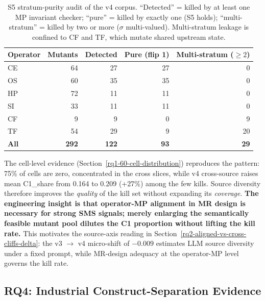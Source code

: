 \documentclass[manuscript,screen,review]{acmart}
\begin{document}
{%
\begin{longtable}[]{@{}lrrrr@{}}
\caption{S5 stratum-purity audit of the v4 corpus. ``Detected'' = killed
by at least one MP invariant checker; ``pure'' = killed by exactly one
(S5 holds); ``multi-stratum'' = killed by two or more ($\sigma$
multi-valued). Multi-stratum leakage is confined to CF and TF, which
mutate shared upstream state.}\label{tab:s5-purity}\\
\toprule\noalign{}
Operator & Mutants & Detected & Pure (flip 1) & Multi-stratum ($\ge 2$) \\
\midrule\noalign{}
\endfirsthead
\endhead
\bottomrule\noalign{}
\endlastfoot
CE & 64 & 27 & 27 & 0 \\
OS & 60 & 35 & 35 & 0 \\
HP & 72 & 11 & 11 & 0 \\
SI & 33 & 11 & 11 & 0 \\
CF & 9 & 9 & 0 & 9 \\
TF & 54 & 29 & 9 & 20 \\
\textbf{All} & \textbf{292} & \textbf{122} & \textbf{93} & \textbf{29} \\
\end{longtable}
}

The cell-level evidence (Section~\ref{rq1-60-cell-distribution}) reproduces the
pattern: 75\% of cells are zero, concentrated in the cross slices, while v4
cross-source raises mean C1\_share from 0.164 to 0.209 (+27\%) among the few
kills. Source diversity therefore improves the \emph{quality} of the kill set
without expanding its \emph{coverage}. \textbf{The engineering insight is that
operator-MP alignment in MR design is necessary for strong SMS signals; merely
enlarging the semantically feasible mutant pool dilutes the C1 proportion
without lifting the kill rate.} This motivates the source-axis reading in
Section~\ref{rq2-aligned-vs-cross-cliffs-delta}: the v3 $\to$ v4 micro-shift of
$-0.009$ estimates LLM source diversity under a fixed prompt, while MR-design
adequacy at the operator-MP level governs the kill rate.

\subsection{RQ4: Industrial Construct-Separation Evidence}\label{rq4-industrial-construct-separation}
\end{document}
